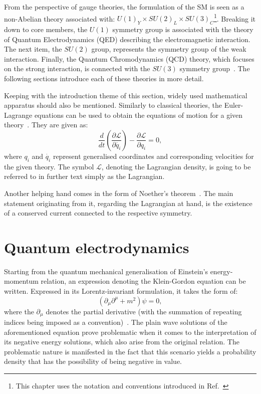\hspace{10pt} From the perspective of gauge theories, the formulation of the SM is seen as a non-Abelian theory associated with: $U(1)_Y \times SU(2)_L \times  SU(3)_C$\footnote{This chapter uses the notation and conventions introduced in Ref.~\cite{thomson_2013}}. Breaking it down to core members, the $U(1)$ symmetry group is associated with the theory of Quantum Electrodynamics (QED) describing the electromagnetic interaction. The next item, the $SU(2)$ group, represents the symmetry group of the weak interaction. Finally, the Quantum Chromodynamics (QCD) theory, which focuses on the strong interaction, is connected with the $SU(3)$ symmetry group~\cite{book:group_theory, book:eliot}. The following sections introduce each of these theories in more detail. 

\hspace{10pt} Keeping with the introduction theme of this section, widely used mathematical apparatus should also be mentioned. Similarly to classical theories, the Euler-Lagrange equations can be used to obtain the equations of motion for a given theory~\cite{book:fox}. They are given as:
\begin{equation}
    \frac{d}{dt}\left ( \frac{\partial \mathcal{L}}{\partial \dot{q_i} } \right ) - \frac{\partial \mathcal{L}}{\partial q_i} =0,
\end{equation}
where $q_i$ and $\dot{q_i}$ represent generalised coordinates and corresponding velocities for the given theory. The symbol $\mathcal{L}$, denoting the Lagrangian density, is going to be referred to in further text simply as the Lagrangian.

\hspace{10pt} Another helping hand comes in the form of Noether's theorem~\cite{paper:noether}. The main statement originating from it, regarding the Lagrangian at hand, is the existence of a conserved current connected to the respective symmetry. 

\section{Quantum electrodynamics}
\hspace{10pt} Starting from the quantum mechanical generalisation of Einstein's energy-momentum relation, an expression denoting the Klein-Gordon equation can be written. Expressed in its Lorentz-invariant formulation, it takes the form of:
\begin{equation}
    (\partial_{\mu}\partial^{\mu}+m^2)\psi = 0,
\end{equation}
where the $\partial_\mu$ denotes the partial derivative (with the summation of repeating indices being imposed as a convention)~\cite{thomson_2013,book:schwartz}. The plain wave solutions of the aforementioned equation prove problematic when it comes to the interpretation of its negative energy solutions, which also arise from the original relation. The problematic nature is manifested in the fact that this scenario yields a probability density that has the possibility of being negative in value.

